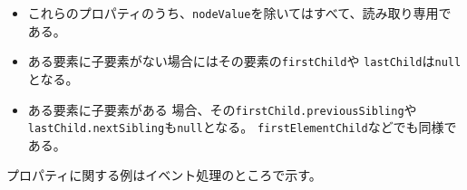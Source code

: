 \begin{itemize}
 \item これらのプロパティのうち、\texttt{nodeValue}を除いてはすべて、読み取り専用である。
 \item ある要素に子要素がない場合にはその要素の\texttt{firstChild}や
\texttt{lastChild}は\texttt{null}となる。
 \item ある要素に子要素がある
場合、その\texttt{firstChild.previousSibling}や
\texttt{lastChild.nextSibling}も\texttt{null}となる。
       \texttt{firstElementChild}などでも同様である。
\end{itemize}

プロパティに関する例はイベント処理のところで示す。



